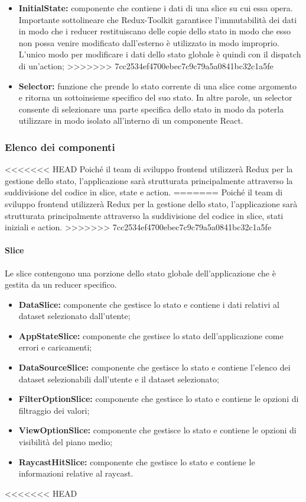 \begin{itemize}
    \item \textbf{InitialState:} componente che contiene i dati di una slice su cui essa opera.
          Importante sottolineare che Redux-Toolkit garantisce l'immutabilità dei dati in modo che i reducer restituiscano delle copie dello stato in modo che esso non possa venire
          modificato dall'esterno è utilizzato in modo improprio.
          L'unico modo per modificare i dati dello stato globale è quindi con il dispatch di un'action;
>>>>>>> 7cc2534ef4700ebec7c9c79a5a0841bc32c1a5fe
    \item \textbf{Selector:} funzione che prende lo stato corrente di una slice come argomento e ritorna un sottoinsieme
          specifico del suo stato. In altre parole, un selector consente di selezionare una parte specifica
          dello stato in modo da poterla utilizzare in modo isolato all'interno di un componente React.
\end{itemize}

\subsubsection{Elenco dei componenti}
<<<<<<< HEAD
Poiché il team di sviluppo frontend utilizzerà Redux per la gestione dello stato, l'applicazione sarà strutturata principalmente attraverso la suddivisione del codice in slice, state e action.
=======
Poiché il team di sviluppo frontend utilizzerà Redux per la gestione dello
stato, l'applicazione sarà strutturata principalmente attraverso la
suddivisione del codice in slice, stati iniziali e action.
>>>>>>> 7cc2534ef4700ebec7c9c79a5a0841bc32c1a5fe
\paragraph{Slice}
Le slice contengono una porzione dello stato globale dell'applicazione che è
gestita da un reducer specifico.
\begin{itemize}
    \item \textbf{DataSlice:} componente che gestisce lo stato e contiene i dati relativi al dataset selezionato dall'utente;
    \item \textbf{AppStateSlice:} componente che gestisce lo stato dell'applicazione come errori e caricamenti;
    \item \textbf{DataSourceSlice:} componente che gestisce lo stato e contiene l'elenco dei dataset selezionabili dall'utente e il dataset selezionato;
    \item \textbf{FilterOptionSlice:} componente che gestisce lo stato e contiene le opzioni di filtraggio dei valori;
    \item \textbf{ViewOptionSlice:} componente che gestisce lo stato e contiene le opzioni di visibilità del piano medio;
    \item \textbf{RaycastHitSlice:} componente che gestisce lo stato e contiene le informazioni relative al raycast.
\end{itemize}
<<<<<<< HEAD
